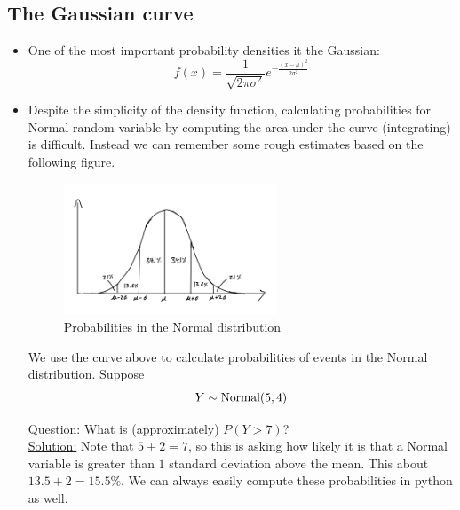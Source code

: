    \subsection{The Gaussian curve}
   \begin{itemize}
   \item One of the most important probability densities it the Gaussian:
   \begin{equation*}
   f(x) = \frac{1}{\sqrt{2\pi \sigma^2}}e^{-\frac{(x-\mu)^2}{2 \sigma^2}}
   \end{equation*}

\item Despite the simplicity of the density function, calculating probabilities for Normal random variable by computing the area under the curve (integrating) is difficult. Instead we can remember some rough estimates based on the following figure. 
\begin{figure}[h]
\centering
\includegraphics[width=0.6\textwidth]{./../figures/bellcurve}
\caption{Probabilities in the Normal distribution}\label{fig:bellcurve}
\end{figure}



\begin{example}
 We use the curve above to calculate probabilities of events in the Normal distribution. Suppose
\begin{equation*}
Y \sim {\rm Normal}(5,4)\\
\end{equation*}


 \noindent
\underline{Question:} What is (approximately) $P(Y > 7)$? \\

 \noindent
\underline{Solution:} Note that $5 + 2 =  7$, so this is asking how likely it is that a Normal variable is greater than $1$ standard deviation above the mean. This about $13.5+2 = 15.5\%$. We can always easily compute these probabilities in python as well.\\ 


\end{example}
\end{itemize}
